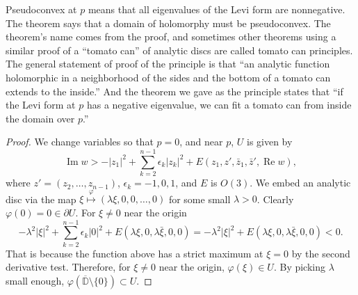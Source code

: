\documentclass[12pt,openany]{book}
\renewcommand{\Re}{\operatorname{Re}}
\renewcommand{\Im}{\operatorname{Im}}
\newcommand{\sabs}[1]{\lvert {#1} \rvert}
\newcommand{\D}{{\mathbb{D}}}
\theoremstyle{plain}
\theoremstyle{remark}
\theoremstyle{definition}
\theoremstyle{exercise}
\theoremstyle{example}
\begin{document}
Pseudoconvex at $p$ means that all eigenvalues of the Levi form are
nonnegative.
The theorem says that a domain of holomorphy must be pseudoconvex.
The theorem's name comes from the proof, and sometimes other theorems using a
similar proof of a ``tomato can'' of analytic discs are called
tomato can principles.
The general statement of proof of the principle is that ``an
analytic function holomorphic in a neighborhood of the sides and the bottom
of a tomato can extends to the inside.''  And the theorem we gave as
the principle states that ``if the Levi form at $p$ has a negative
eigenvalue, we can fit a tomato can from inside the domain over $p$.''

\begin{proof}
We change variables so that $p = 0$, and
near $p$, $U$ is given by
\begin{equation*}
\Im w > -\sabs{z_1}^2 + \sum_{k=2}^{n-1} \epsilon_k \sabs{z_k}^2 +
E(z_1,z',\bar{z}_1,\bar{z}',\Re w) ,
\end{equation*}
where $z' = (z_2,\ldots,z_{n-1})$, $\epsilon_k = -1,0,1$, and $E$ is $O(3)$.
We embed an analytic disc via the map
$\xi \overset{\varphi}{\mapsto} (\lambda \xi, 0, 0, \ldots, 0)$
for some small $\lambda > 0$.
Clearly $\varphi(0) = 0 \in \partial U$.  For $\xi \not= 0$ near the origin
\begin{equation*}
-\lambda^2 \sabs{\xi}^2 + \sum_{k=2}^{n-1} \epsilon_k \sabs{0}^2 + E(\lambda
\xi,0,\lambda \bar{\xi},0,0)
=
-\lambda^2 \sabs{\xi}^2 + E(\lambda
\xi,0,\lambda \bar{\xi},0,0)
< 0 .
\end{equation*}
That is because
the function above has a strict maximum at $\xi = 0$
by the second derivative test.
Therefore, for $\xi \not= 0$ near the origin,
$\varphi(\xi) \in U$.  By picking $\lambda$ small enough,
$\varphi(\overline{\D}\setminus\{0\}) \subset U$.


\end{proof}
\end{document}
